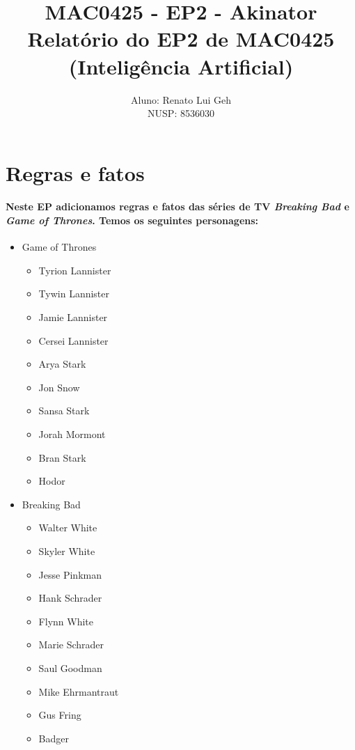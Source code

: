 \documentclass[a4paper,10pt]{article}
\theoremstyle{plain}
\begin{document}
\title{\textbf{MAC0425 - EP2 - Akinator} \\ Relatório do EP2 de MAC0425 (Inteligência Artificial)}
\author{Aluno: Renato Lui Geh \\ NUSP: 8536030}

\maketitle

\section{Regras e fatos}

\paragraph{
  Neste EP adicionamos regras e fatos das séries de TV \textit{Breaking Bad} e \textit{Game of Thrones}.
  Temos os seguintes personagens:
}

\begin{itemize}
  \item Game of Thrones
    \begin{itemize}
      \item Tyrion Lannister
      \item Tywin Lannister
      \item Jamie Lannister
      \item Cersei Lannister
      \item Arya Stark
      \item Jon Snow
      \item Sansa Stark
      \item Jorah Mormont
      \item Bran Stark
      \item Hodor
    \end{itemize}
  \item Breaking Bad
    \begin{itemize}
      \item Walter White
      \item Skyler White
      \item Jesse Pinkman
      \item Hank Schrader
      \item Flynn White
      \item Marie Schrader
      \item Saul Goodman
      \item Mike Ehrmantraut
      \item Gus Fring
      \item Badger
    \end{itemize}
\end{itemize}
\end{document}
